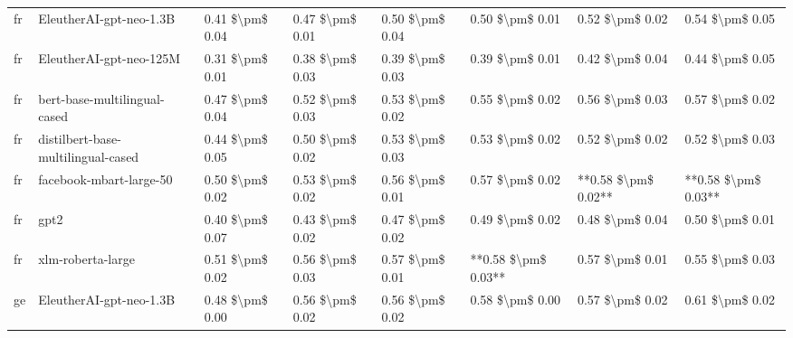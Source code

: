 \begin{tabular}{llllllll}
      fr &            EleutherAI-gpt-neo-1.3B & 0.41 \$\textbackslash pm\$ 0.04 &           0.47 \$\textbackslash pm\$ 0.01 &       0.50 \$\textbackslash pm\$ 0.04 &        0.50 \$\textbackslash pm\$ 0.01 &                         0.52 \$\textbackslash pm\$ 0.02 &     0.54 \$\textbackslash pm\$ 0.05 \\
      fr &            EleutherAI-gpt-neo-125M & 0.31 \$\textbackslash pm\$ 0.01 &           0.38 \$\textbackslash pm\$ 0.03 &       0.39 \$\textbackslash pm\$ 0.03 &        0.39 \$\textbackslash pm\$ 0.01 &                         0.42 \$\textbackslash pm\$ 0.04 &     0.44 \$\textbackslash pm\$ 0.05 \\
      fr &       bert-base-multilingual-cased & 0.47 \$\textbackslash pm\$ 0.04 &           0.52 \$\textbackslash pm\$ 0.03 &       0.53 \$\textbackslash pm\$ 0.02 &        0.55 \$\textbackslash pm\$ 0.02 &                         0.56 \$\textbackslash pm\$ 0.03 &     0.57 \$\textbackslash pm\$ 0.02 \\
      fr & distilbert-base-multilingual-cased & 0.44 \$\textbackslash pm\$ 0.05 &           0.50 \$\textbackslash pm\$ 0.02 &       0.53 \$\textbackslash pm\$ 0.03 &        0.53 \$\textbackslash pm\$ 0.02 &                         0.52 \$\textbackslash pm\$ 0.02 &     0.52 \$\textbackslash pm\$ 0.03 \\
      fr &            facebook-mbart-large-50 & 0.50 \$\textbackslash pm\$ 0.02 &           0.53 \$\textbackslash pm\$ 0.02 &       0.56 \$\textbackslash pm\$ 0.01 &        0.57 \$\textbackslash pm\$ 0.02 &                     **0.58 \$\textbackslash pm\$ 0.02** & **0.58 \$\textbackslash pm\$ 0.03** \\
      fr &                               gpt2 & 0.40 \$\textbackslash pm\$ 0.07 &           0.43 \$\textbackslash pm\$ 0.02 &       0.47 \$\textbackslash pm\$ 0.02 &        0.49 \$\textbackslash pm\$ 0.02 &                         0.48 \$\textbackslash pm\$ 0.04 &     0.50 \$\textbackslash pm\$ 0.01 \\
      fr &                  xlm-roberta-large & 0.51 \$\textbackslash pm\$ 0.02 &           0.56 \$\textbackslash pm\$ 0.03 &       0.57 \$\textbackslash pm\$ 0.01 &    **0.58 \$\textbackslash pm\$ 0.03** &                         0.57 \$\textbackslash pm\$ 0.01 &     0.55 \$\textbackslash pm\$ 0.03 \\
      ge &            EleutherAI-gpt-neo-1.3B & 0.48 \$\textbackslash pm\$ 0.00 &           0.56 \$\textbackslash pm\$ 0.02 &       0.56 \$\textbackslash pm\$ 0.02 &        0.58 \$\textbackslash pm\$ 0.00 &                         0.57 \$\textbackslash pm\$ 0.02 &     0.61 \$\textbackslash pm\$ 0.02 \\

\end{tabular}
